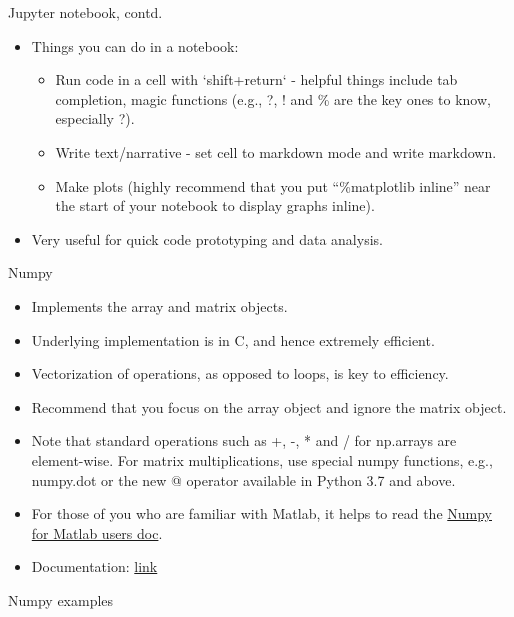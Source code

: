 \documentclass[aspectratio=169]{beamer}
\begin{document}
\begin{frame}{Jupyter notebook, contd.}
    \begin{itemize}
        \item Things you can do in a notebook:
        \begin{itemize}
            \item Run code in a cell with `shift+return` - helpful things include tab completion, magic functions (e.g., ?, ! and \% are the key ones to know, especially ?).
            \item Write text/narrative - set cell to markdown mode and write markdown.
            \item Make plots (highly recommend that you put ``\%matplotlib inline'' near the start of your notebook to display graphs inline).
        \end{itemize}
        \item Very useful for quick code prototyping and data analysis.
    \end{itemize}
\end{frame}


\begin{frame}{Numpy}
    \begin{itemize}
        \item Implements the array and matrix objects.
        \item Underlying implementation is in C, and hence extremely efficient.
        \item Vectorization of operations, as opposed to loops, is key to efficiency.
        \item Recommend that you focus on the array object and ignore the matrix object.
        \item Note that standard operations such as +, -, * and / for np.arrays are element-wise. For matrix multiplications, use special numpy functions, e.g., numpy.dot or the new @ operator available in Python 3.7 and above.
        \item For those of you who are familiar with Matlab, it helps to read the \href{https://docs.scipy.org/doc/numpy/user/numpy-for-matlab-users.html}{Numpy for Matlab users doc}.
        \item Documentation: \href{http://docs.scipy.org/doc/numpy/}{link}
    \end{itemize}
\end{frame}


\begin{frame}[fragile]{Numpy examples}
    \inputminted{python}{example_numpy.py}
\end{frame}
\end{document}
